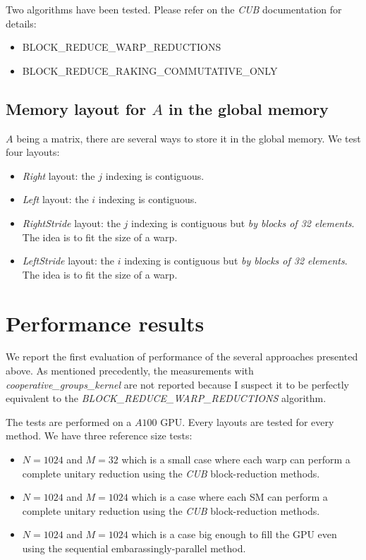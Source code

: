 \documentclass{article}
\begin{document}
Two algorithms have been tested. Please refer on the \textit{CUB} documentation for details:

\begin{itemize}
\item BLOCK\_REDUCE\_WARP\_REDUCTIONS
\item BLOCK\_REDUCE\_RAKING\_COMMUTATIVE\_ONLY 
\end{itemize}

\subsection{Memory layout for $A$ in the global memory}

$A$ being a matrix, there are several ways to store it in the global memory. We test four layouts:

\begin{itemize}
	\item \textit{Right} layout: the $j$ indexing is contiguous.
	\item \textit{Left} layout: the $i$ indexing is contiguous.
	\item \textit{RightStride} layout: the $j$ indexing is contiguous but \textit{by blocks of 32 elements}. The idea is to fit the size of a warp.
	\item \textit{LeftStride} layout: the $i$ indexing is contiguous but \textit{by blocks of 32 elements}. The idea is to fit the size of a warp.
\end{itemize}

\section{Performance results}

We report the first evaluation of performance of the several approaches presented above. As mentioned precedently, the measurements with \textit{cooperative\_groups\_kernel} are not reported because I suspect it to be perfectly equivalent to the \textit{BLOCK\_REDUCE\_WARP\_REDUCTIONS} algorithm.

The tests are performed on a $A100$ GPU. Every layouts are tested for every method. We have three reference size tests:

\begin{itemize}
	\item $N = 1024$ and $M=32$ which is a small case where each warp can perform a complete unitary reduction using the \textit{CUB} block-reduction methods.
	\item $N = 1024$ and $M=1024$ which is a case where each SM can perform a complete unitary reduction using the \textit{CUB} block-reduction methods.
	\item $N = 1024$ and $M=1024$ which is a case big enough to fill the GPU even using the sequential embarassingly-parallel method.
\end{itemize}

\newpage
\nocite{*}


\end{document}
